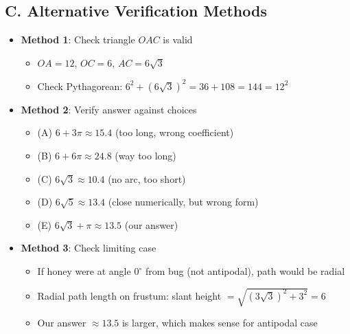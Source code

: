 \documentclass[12pt]{article}
\begin{document}
\begin{verificationbox}
\subsection*{C. Alternative Verification Methods}
\begin{itemize}[leftmargin=*]
    \item \textbf{Method 1}: Check triangle $OAC$ is valid
    \begin{itemize}
        \item $OA = 12$, $OC = 6$, $AC = 6\sqrt{3}$
        \item Check Pythagorean: $6^2 + (6\sqrt{3})^2 = 36 + 108 = 144 = 12^2$ \checkmark
    \end{itemize}
    \item \textbf{Method 2}: Verify answer against choices
    \begin{itemize}
        \item (A) $6 + 3\pi \approx 15.4$ (too long, wrong coefficient)
        \item (B) $6 + 6\pi \approx 24.8$ (way too long)
        \item (C) $6\sqrt{3} \approx 10.4$ (no arc, too short)
        \item (D) $6\sqrt{5} \approx 13.4$ (close numerically, but wrong form)
        \item (E) $6\sqrt{3} + \pi \approx 13.5$ (our answer) \checkmark
    \end{itemize}
    \item \textbf{Method 3}: Check limiting case
    \begin{itemize}
        \item If honey were at angle $0^\circ$ from bug (not antipodal), path would be radial
        \item Radial path length on frustum: slant height $= \sqrt{(3\sqrt{3})^2 + 3^2} = 6$
        \item Our answer $\approx 13.5$ is larger, which makes sense for antipodal case
    \end{itemize}
\end{itemize}
\end{verificationbox}
\end{document}
